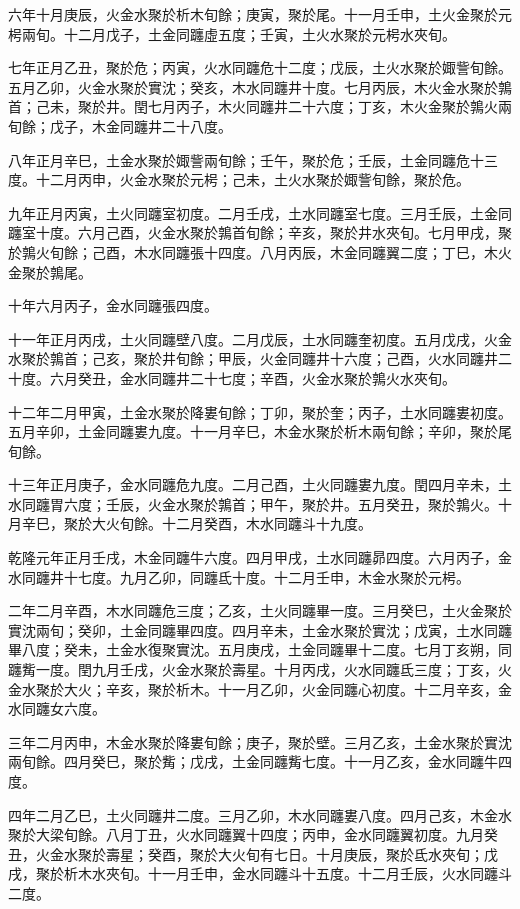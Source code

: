 \begin{pinyinscope}
六年十月庚辰，火金水聚於析木旬餘；庚寅，聚於尾。十一月壬申，土火金聚於元枵兩旬。十二月戊子，土金同躔虛五度；壬寅，土火水聚於元枵水夾旬。

七年正月乙丑，聚於危；丙寅，火水同躔危十二度；戊辰，土火水聚於娵訾旬餘。五月乙卯，火金水聚於實沈；癸亥，木水同躔井十度。七月丙辰，木火金水聚於鶉首；己未，聚於井。閏七月丙子，木火同躔井二十六度；丁亥，木火金聚於鶉火兩旬餘；戊子，木金同躔井二十八度。

八年正月辛巳，土金水聚於娵訾兩旬餘；壬午，聚於危；壬辰，土金同躔危十三度。十二月丙申，火金水聚於元枵；己未，土火水聚於娵訾旬餘，聚於危。

九年正月丙寅，土火同躔室初度。二月壬戌，土水同躔室七度。三月壬辰，土金同躔室十度。六月己酉，火金水聚於鶉首旬餘；辛亥，聚於井水夾旬。七月甲戌，聚於鶉火旬餘；己酉，木水同躔張十四度。八月丙辰，木金同躔翼二度；丁巳，木火金聚於鶉尾。

十年六月丙子，金水同躔張四度。

十一年正月丙戌，土火同躔壁八度。二月戊辰，土水同躔奎初度。五月戊戌，火金水聚於鶉首；己亥，聚於井旬餘；甲辰，火金同躔井十六度；己酉，火水同躔井二十度。六月癸丑，金水同躔井二十七度；辛酉，火金水聚於鶉火水夾旬。

十二年二月甲寅，土金水聚於降婁旬餘；丁卯，聚於奎；丙子，土水同躔婁初度。五月辛卯，土金同躔婁九度。十一月辛巳，木金水聚於析木兩旬餘；辛卯，聚於尾旬餘。

十三年正月庚子，金水同躔危九度。二月己酉，土火同躔婁九度。閏四月辛未，土水同躔胃六度；壬辰，火金水聚於鶉首；甲午，聚於井。五月癸丑，聚於鶉火。十月辛巳，聚於大火旬餘。十二月癸酉，木水同躔斗十九度。

乾隆元年正月壬戌，木金同躔牛六度。四月甲戌，土水同躔昴四度。六月丙子，金水同躔井十七度。九月乙卯，同躔氐十度。十二月壬申，木金水聚於元枵。

二年二月辛酉，木水同躔危三度；乙亥，土火同躔畢一度。三月癸巳，土火金聚於實沈兩旬；癸卯，土金同躔畢四度。四月辛未，土金水聚於實沈；戊寅，土水同躔畢八度；癸未，土金水復聚實沈。五月庚戌，土金同躔畢十二度。七月丁亥朔，同躔觜一度。閏九月壬戌，火金水聚於壽星。十月丙戌，火水同躔氐三度；丁亥，火金水聚於大火；辛亥，聚於析木。十一月乙卯，火金同躔心初度。十二月辛亥，金水同躔女六度。

三年二月丙申，木金水聚於降婁旬餘；庚子，聚於壁。三月乙亥，土金水聚於實沈兩旬餘。四月癸巳，聚於觜；戊戌，土金同躔觜七度。十一月乙亥，金水同躔牛四度。

四年二月乙巳，土火同躔井二度。三月乙卯，木水同躔婁八度。四月己亥，木金水聚於大梁旬餘。八月丁丑，火水同躔翼十四度；丙申，金水同躔翼初度。九月癸丑，火金水聚於壽星；癸酉，聚於大火旬有七日。十月庚辰，聚於氐水夾旬；戊戌，聚於析木水夾旬。十一月壬申，金水同躔斗十五度。十二月壬辰，火水同躔斗二度。


\end{pinyinscope}
